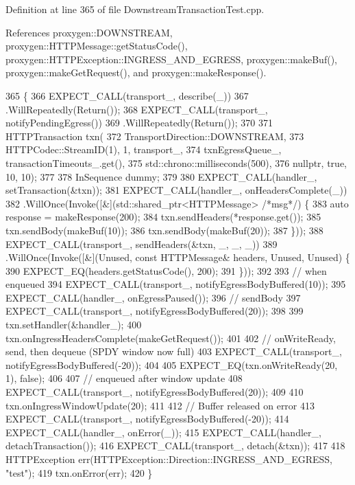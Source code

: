 Definition at line 365 of file Downstream\+Transaction\+Test.\+cpp.



References proxygen\+::\+D\+O\+W\+N\+S\+T\+R\+E\+AM, proxygen\+::\+H\+T\+T\+P\+Message\+::get\+Status\+Code(), proxygen\+::\+H\+T\+T\+P\+Exception\+::\+I\+N\+G\+R\+E\+S\+S\+\_\+\+A\+N\+D\+\_\+\+E\+G\+R\+E\+SS, proxygen\+::make\+Buf(), proxygen\+::make\+Get\+Request(), and proxygen\+::make\+Response().


\begin{DoxyCode}
365                                                   \{
366   EXPECT\_CALL(transport\_, describe(\_))
367     .WillRepeatedly(Return());
368   EXPECT\_CALL(transport\_, notifyPendingEgress())
369     .WillRepeatedly(Return());
370 
371   HTTPTransaction txn(
372     TransportDirection::DOWNSTREAM,
373     HTTPCodec::StreamID(1), 1, transport\_,
374     txnEgressQueue\_, transactionTimeouts\_.get(),
375     std::chrono::milliseconds(500),
376     \textcolor{keyword}{nullptr}, \textcolor{keyword}{true}, 10, 10);
377 
378   InSequence dummy;
379 
380   EXPECT\_CALL(handler\_, setTransaction(&txn));
381   EXPECT\_CALL(handler\_, onHeadersComplete(\_))
382       .WillOnce(Invoke([&](std::shared\_ptr<HTTPMessage> \textcolor{comment}{/*msg*/}) \{
383         \textcolor{keyword}{auto} response = makeResponse(200);
384         txn.sendHeaders(*response.get());
385         txn.sendBody(makeBuf(10));
386         txn.sendBody(makeBuf(20));
387       \}));
388   EXPECT\_CALL(transport\_, sendHeaders(&txn, \_, \_, \_))
389     .WillOnce(Invoke([&](Unused, \textcolor{keyword}{const} HTTPMessage& headers, Unused, Unused) \{
390           EXPECT\_EQ(headers.getStatusCode(), 200);
391         \}));
392 
393   \textcolor{comment}{// when enqueued}
394   EXPECT\_CALL(transport\_, notifyEgressBodyBuffered(10));
395   EXPECT\_CALL(handler\_, onEgressPaused());
396   \textcolor{comment}{// sendBody}
397   EXPECT\_CALL(transport\_, notifyEgressBodyBuffered(20));
398 
399   txn.setHandler(&handler\_);
400   txn.onIngressHeadersComplete(makeGetRequest());
401 
402   \textcolor{comment}{// onWriteReady, send, then dequeue (SPDY window now full)}
403   EXPECT\_CALL(transport\_, notifyEgressBodyBuffered(-20));
404 
405   EXPECT\_EQ(txn.onWriteReady(20, 1), \textcolor{keyword}{false});
406 
407   \textcolor{comment}{// enqueued after window update}
408   EXPECT\_CALL(transport\_, notifyEgressBodyBuffered(20));
409 
410   txn.onIngressWindowUpdate(20);
411 
412   \textcolor{comment}{// Buffer released on error}
413   EXPECT\_CALL(transport\_, notifyEgressBodyBuffered(-20));
414   EXPECT\_CALL(handler\_, onError(\_));
415   EXPECT\_CALL(handler\_, detachTransaction());
416   EXPECT\_CALL(transport\_, detach(&txn));
417 
418   HTTPException err(HTTPException::Direction::INGRESS\_AND\_EGRESS, \textcolor{stringliteral}{"test"});
419   txn.onError(err);
420 \}
\end{DoxyCode}
